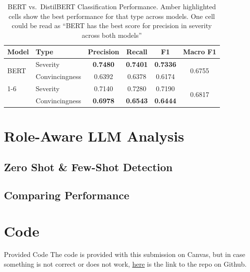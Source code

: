 \documentclass[12pt]{article}
\begin{document}
\begin{table}[H]
    \centering
    \renewcommand{\arraystretch}{1.4}
    \begin{tabular}{l l c c c c}
        \toprule
        \rowcolor{modelheader}
        \color{white}\textbf{Model} & \color{white}\textbf{Type} & \color{white}\textbf{Precision} & \color{white}\textbf{Recall} & \color{white}\textbf{F1} & \color{white}\textbf{Macro F1} \\
        \midrule
        \multirow{2}{*}{BERT}       & Severity       & \cellcolor{modelhighlight}\textbf{0.7480} & \cellcolor{modelhighlight}\textbf{0.7401} & \cellcolor{modelhighlight}\textbf{0.7336} & \multirow{2}{*}{0.6755} \\
                                     & Convincingness & 0.6392 & 0.6378 & 0.6174 & \\
        \cmidrule{1-6}
                          \multirow{2}{*}{DistilBERT} & Severity       & 0.7140 & 0.7280 & 0.7190 & \multirow{2}{*}{0.6817} \\
                                                       & Convincingness & \cellcolor{modelhighlight}\textbf{0.6978} & \cellcolor{modelhighlight}\textbf{0.6543} & \cellcolor{modelhighlight}\textbf{0.6444} & \\
        \bottomrule
    \end{tabular}
    \caption{BERT vs.\ DistilBERT Classification Performance. Amber highlighted cells show the best
    performance for that type across models. One cell could be read as ``BERT has the best score for
    precision in severity across both models''}
    \label{tab:model-comparison}
\end{table}

\section{Role-Aware LLM Analysis}

\subsection{Zero Shot \& Few-Shot Detection}

\subsection{Comparing Performance}

\section{Code}

\begin{aside}{Provided Code}
    The code is provided with this submission on Canvas, but in case something is not correct 
    or does not work, \href{github}{here} is the link to the repo on Github.
\end{aside}
\end{document}
